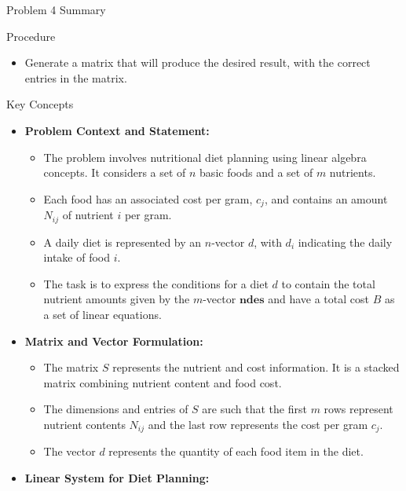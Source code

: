 \begin{summary}{Problem 4 Summary}
    \begin{statement}{Procedure}
        \begin{itemize}
            \item Generate a matrix that will produce the desired result, with the correct entries in the matrix.
        \end{itemize}
    \end{statement}
    \begin{statement}{Key Concepts}
        \begin{itemize}
            \item \textbf{Problem Context and Statement:}
            \begin{itemize}
                \item The problem involves nutritional diet planning using linear algebra concepts. It considers a set of $n$ basic foods and a set of $m$ nutrients.
                \item Each food has an associated cost per gram, $c_j$, and contains an amount $N_{ij}$ of nutrient $i$ per gram.
                \item A daily diet is represented by an $n$-vector $d$, with $d_i$ indicating the daily intake of food $i$.
                \item The task is to express the conditions for a diet $d$ to contain the total nutrient amounts given by the $m$-vector $\mathbf{ndes}$ and have a total cost $B$ as a 
                set of linear equations.
            \end{itemize}
            \item \textbf{Matrix and Vector Formulation:}
            \begin{itemize}
                \item The matrix $S$ represents the nutrient and cost information. It is a stacked matrix combining nutrient content and food cost.
                \item The dimensions and entries of $S$ are such that the first $m$ rows represent nutrient contents $N_{ij}$ and the last row represents the cost per gram $c_j$.
                \item The vector $d$ represents the quantity of each food item in the diet.
            \end{itemize}
            \item \textbf{Linear System for Diet Planning:}
            \begin{itemize}

\end{itemize}
\end{itemize}
\end{statement}
\end{summary}
